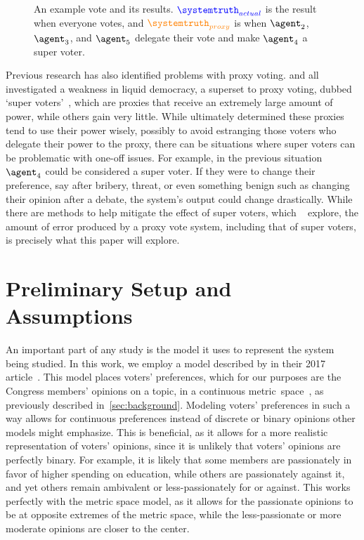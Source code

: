 \begin{figure}[htbp]
    \centering
    
    \caption{
        An example vote and its results.
        $\textcolor{blue}{\systemtruth_{actual}}$ is the result when everyone votes,
        and $\textcolor{orange}{\systemtruth_{proxy}}$ is when $\agent_2$, $\agent_3$,
        and $\agent_5$ delegate their vote and make $\agent_4$ a super voter.
    }
    \label{fig:voting-example}
\end{figure}

Previous research has also identified problems with proxy voting.
 and  all investigated a weakness in liquid democracy, a
superset to proxy voting, dubbed `super voters'~\cite{Kling2015,Golz2021}, which are
proxies that receive an extremely large amount of power, while others gain very little.
While  ultimately determined these proxies tend to use their power
wisely, possibly to avoid estranging those voters who delegate their power to the
proxy, there can be situations where super voters can be problematic with one-off
issues.
For example, in the previous situation $\agent_4$ could be considered a super voter.
If they were to change their preference, say after bribery, threat, or even
something benign such as changing their opinion after a debate, the system's output
could change drastically.
While there are methods to help mitigate the effect of super voters, which
~\cite{Golz2021} explore, the amount of error produced by a proxy vote
system, including that of super voters, is precisely what this paper will explore.


\section{Preliminary Setup and Assumptions}\label{sec:setup-and-assumptions}
An important part of any study is the model it uses to represent the system being
studied.
In this work, we employ a model described by  in their 2017
article~\cite{Cohensius2017}.
This model places voters' preferences, which for our purposes are the Congress
members' opinions on a topic, in a continuous metric~space~\systemspace, as
previously described in~\autoref{sec:background}.
Modeling voters' preferences in such a way allows for continuous preferences instead of
discrete or binary opinions other models might emphasize.
This is beneficial, as it allows for a more realistic representation of voters'
opinions, since it is unlikely that voters' opinions are perfectly binary.
For example, it is likely that some members are passionately in favor of higher
spending on education, while others are passionately against it, and yet others
remain ambivalent or less-passionately for or against.
This works perfectly with the metric space model, as it allows for the passionate
opinions to be at opposite extremes of the metric space, while the less-passionate or
more moderate opinions are closer to the center.

